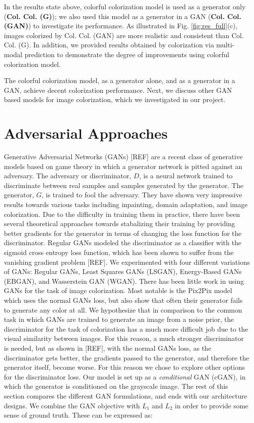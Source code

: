 \documentclass[10pt]{article}
\begin{document}
In the results state above, colorful colorization model is used as a generator only (\textbf{Col. Col. (G)}); we also used this model as a generator in a GAN (\textbf{Col. Col. (GAN)}) to investigate its performance. As illustrated in Fig. \ref{fig:res_full}(c), images colorized  by Col. Col. (GAN) are more realistic and consistent than Col. Col. (G). In addition, we provided results obtained by colorization via multi-modal prediction \cite{charpiat2008automatic} to demonstrate the degree of improvements using colorful colorization model. 

The colorful colorization model, as a generator alone, and as a generator in a GAN, achieve decent colorization performance. Next, we discuss other GAN based models for image colorization, which we investigated in our project. 
 


 

\section{Adversarial Approaches}
Generative Adversarial Networks (GANs) [REF] are a recent class of generative models based on game theory
in which a generator network is pitted against an adversary. The adversary or discriminator, $D$, is a 
neural network trained to discriminate between real samples and samples generated by the generator. The
generator, $G$, is trained to fool the adversary. They have shown very impressive results towards
various tasks including inpainting, domain adaptation, and image colorization. Due to the difficulty in
training them in practice, there have been several theoretical approaches towards stabalizing their training
by providing better gradients for the generator in terms of changing the loss function for the discriminator.
Regular GANs modeled the discriminator as a classifier with the sigmoid cross entropy loss function,
which has been shown to suffer from the vanishing gradient problem [REF]. We experimented with four different
variations of GANs: Regular GANs, Least Squares GANs (LSGAN), Energy-Based GANs (EBGAN), and Wasserstein GAN
(WGAN). There has been little work in using GANs for the task of image colorization. Most notable is the
Pix2Pix model which uses the normal GANs loss, but also show that often their generator fails to generate
any color at all. We hypothesize that in comparison to the common task in which GANs are trained to generate
an image from a noise prior, the discriminator for the task of colorization has a much more difficult job
due to the visual similarity between images. For this reason, a much stronger discriminator is needed, but
as shown in [REF], with the normal GANs loss, as the discriminator gets better, the gradients passed to the
generator, and therefore the generator itself, become worse. For this reason we chose to explore other
options for the discriminator loss. Our model is set up as a \textit{conditional} GAN (cGAN), in which the
generator is conditioned on the grayscale image. The rest of this section compares the different GAN
formulations, and ends with our architecture designs. We combine the GAN objective with $L_1$ and $L_2$ in
order to provide some sense of ground truth. These can be expressed as:
\end{document}
